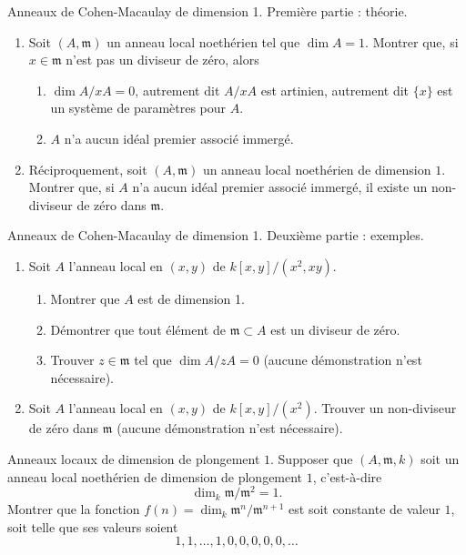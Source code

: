 \begin{exercise}
\label{exercise-CM-dim-1-I}
Anneaux de Cohen-Macaulay de dimension 1. Première partie : théorie.
\begin{enumerate}
\item Soit $(A, {\mathfrak m})$ un anneau local noethérien tel que $\dim A = 1$.
Montrer que, si $x\in {\mathfrak m}$ n'est pas un diviseur de zéro, alors
\begin{enumerate}
\item $\dim A/xA = 0$, autrement dit $A/xA$ est artinien,
autrement dit $\{x\}$ est un système de paramètres pour $A$.
\item $A$ n'a aucun idéal premier associé immergé.
\end{enumerate}
\item Réciproquement, soit $(A, {\mathfrak m})$ un anneau local noethérien de
dimension $1$. Montrer que, si $A$ n'a aucun idéal premier associé immergé, il existe
un non-diviseur de zéro dans ${\mathfrak m}$.
\end{enumerate}
\end{exercise}

\begin{exercise}
\label{exercise-CM-dim-1-II}
Anneaux de Cohen-Macaulay de dimension 1. Deuxième partie : exemples.
\begin{enumerate}
\item Soit $A$ l'anneau local en $(x, y)$ de $k[x, y]/(x^2, xy)$.
\begin{enumerate}
\item Montrer que $A$ est de dimension 1.
\item Démontrer que tout élément de ${\mathfrak m}\subset A$ est un
diviseur de zéro.
\item Trouver $z\in {\mathfrak m}$ tel que $\dim A/zA = 0$
(aucune démonstration n'est nécessaire).
\end{enumerate}
\item Soit $A$ l'anneau local en $(x, y)$ de $k[x, y]/(x^2)$.
Trouver un non-diviseur de zéro dans ${\mathfrak m}$ (aucune démonstration n'est nécessaire).
\end{enumerate}
\end{exercise}

\begin{exercise}
\label{exercise-embedding-dim-1}
Anneaux locaux de dimension de plongement $1$.
Supposer que $(A, {\mathfrak m}, k)$ soit un anneau local noethérien
de dimension de plongement $1$, c'est-à-dire
$$
\dim_k {\mathfrak m}/{\mathfrak m}^2 = 1.
$$
Montrer que la fonction $f(n) = \dim_k {\mathfrak m}^n/{\mathfrak m}^{n + 1}$
est soit constante de valeur $1$, soit telle que ses valeurs soient
$$
1, 1, \ldots, 1, 0, 0, 0, 0, 0, \ldots
$$
\end{exercise}

